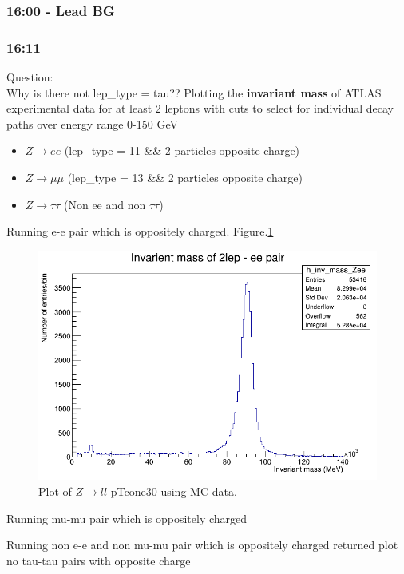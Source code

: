 

\subsubsection*{\textbf{16:00} - Lead BG}

\subsubsection*{\textbf{16:11}}
Question:\\
Why is there not lep\_type = tau??
Plotting the \textbf{invariant mass} of ATLAS experimental data for at least 2 leptons with cuts to select for individual decay paths over energy range 0-150 GeV
\begin{itemize}
    \item $Z \rightarrow ee$ (lep\_type = 11 \&\& 2 particles opposite charge)
    \item $Z \rightarrow \mu\mu$ (lep\_type = 13 \&\& 2 particles opposite charge)
    \item $Z \rightarrow \tau\tau$ (Non ee and non $\tau\tau$)
\end{itemize}

Running e-e pair which is oppositely charged. Figure.\ref{fig:2lep_ee-pair_0-140GeV_11-02-21_16-12}

\begin{figure}[h!]
    \centering
    \includegraphics[width=0.85\linewidth]{plots/11-02-2021/2lep-fast_ee-pair_inv-mass_0-140GeV_11-02-21_16-12}
    \caption{Plot of $Z \rightarrow ll$ pTcone30 using MC data.
    }\label{fig:2lep_ee-pair_0-140GeV_11-02-21_16-12}
\end{figure}

Running mu-mu pair which is oppositely charged

Running non e-e and non mu-mu pair which is oppositely charged
returned plot no tau-tau pairs with opposite charge
